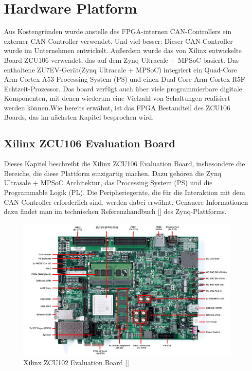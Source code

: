 \section{Hardware Platform}
\label{cha:ver:sec:Hardware_Platform}

Aus Kostengründen wurde anstelle des FPGA-internen CAN-Controllers ein externer CAN-Controller verwendet. Und viel besser: Dieser CAN-Controller wurde im Unternehmen entwickelt.  Außerdem wurde das von Xilinx entwickelte Board ZCU106 verwendet, das auf dem Zynq Ultracale + MPSoC basiert. Das enthaltene ZU7EV-Gerät(Zynq Ultracale + MPSoC) integriert ein Quad-Core Arm Cortex-A53 Processing System (PS) und einen Dual-Core Arm Cortex-R5F Echtzeit-Prozessor. Das board verfügt auch über viele programmierbare digitale Komponenten, mit denen wiederum eine Vielzahl von Schaltungen realisiert werden können.Wie bereits erwähnt, ist das FPGA Bestandteil des ZCU106 Boards, das im nächsten Kapitel besprochen wird.

\subsection{Xilinx ZCU106 Evaluation Board}

Dieses Kapitel beschreibt die Xilinx ZCU106 Evaluation Board, insbesondere die Bereiche, die diese Plattform einzigartig machen. Dazu gehören die Zynq Ultrasale + MPSoC Architektur, das Processing System (PS) und die Programmable Logik (PL). Die Peripheriegeräte, die für die Interaktion mit dem CAN-Controller erforderlich sind, werden dabei erwähnt. Genauere Informationen dazu findet man im technischen Referenzhandbuch [\cite{XilinxInc.2019}] des Zynq-Plattforms. 

\begin{figure}[h]
	\begin{center}
		\includegraphics[width=1\textwidth]{./images/zcu106.jpg}
	\end{center}
	\vspace{-5pt}
	\caption[Xilinx ZCU102 Evaluation Board]{Xilinx ZCU102 Evaluation Board [\cite{zcuboard.}]}  %
	\label{fig:zcu:board}
	\vspace{-5pt}
\end{figure}

